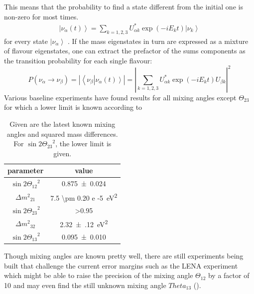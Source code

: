 	This means that the probability to find a state different from the initial one is non-zero for most times.
	\begin{equation}
		\begin{split}
			\left|\nu_\alpha(t)\right> = \sum_{k = 1,2,3} U^*_{\alpha k}\exp\left(-iE_k t\right)\left|\nu_k\right>
		\end{split}
	\end{equation}
	for every state $\left|\nu_\alpha\right>$ . If the mass eigenstates in turn are expressed as a mixture of flavour eigenstates, one can extract the prefactor of the sums components as the transition probability for each single flavour:
	\begin{equation}
		P(\nu_\alpha \rightarrow\nu_\beta) = \left| \left<\nu_\beta\right|\left.\nu_\alpha(t)\right>\right|= \left|\sum_{k=1,2,3}U^*_{\alpha k} \exp{\left(-iE_kt\right)}U_{\beta k}\right|^2
	\end{equation}
	Various baseline experiments have found results for all mixing angles except $\Theta_{23}$ for which a lower limit is known according to \cite{reviewOfParticlePhysics}
	\begin{table}
	\centering
		\begin{tabular}{|c|c|}
		\hline
			parameter & value\\
			\hline
			$\sin{2\Theta_{12}}^2$& \SI{0.875\pm 0.024}{}\\
			$\Delta {m^2}_{21}$&\SI{7.5 \pm 0.20 e -5}{\square\electronvolt}\\
			$\sin{2\Theta_{23}}^2$& >\SI{0.95}{}\\
			$\Delta {m^2}_{32}$ & \SI{2.32(12)}{\square\electronvolt} \\
			$\sin{2\Theta_{13}}^2$ & \SI{0.095\pm0.010}{}\\
			\hline
		\end{tabular}
		\caption[Neutrino parameters]{Given are the latest known mixing angles and squared mass differences. For $\sin{2\Theta_{23}}^2$, the lower limit is given.}
		Though mixing angles are known pretty well, there are still experiments being built that challenge the current error margins such as the LENA experiment which might be able to raise the precision of the mixing angle $\Theta_{12}$ by a factor of 10 and  may even find the still unknown mixing angle $Theta_{13}$ (\cite{LENA}).
		\label{tab:neutrinoParameters}
	\end{table}
	
